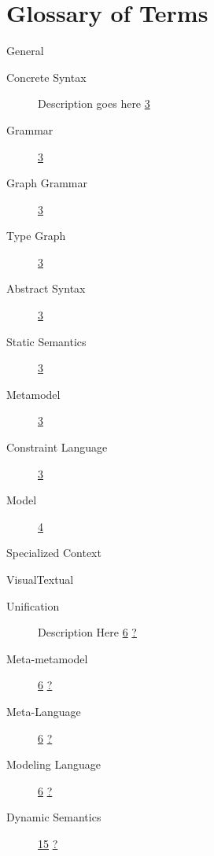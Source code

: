 \section{Glossary of Terms}

{\Large General}

\begin{description}

\item[Concrete Syntax] Description goes here \hfill \hyperlink{page.3}{3}

\item[Grammar] \hfill \hyperlink{page.3}{3} 

\item[Graph Grammar] \hfill \hyperlink{page.3}{3}

\item[Type Graph] \hfill \hyperlink{page.3}{3}

\item[Abstract Syntax] \hfill \hyperlink{page.3}{3}

\item[Static Semantics] \hfill \hyperlink{page.3}{3}

\item[Metamodel] \hfill \hyperlink{page.3}{3}

\item[Constraint Language] \hfill \hyperlink{page.3}{3}

\item[Model] \hfill \hyperlink{page.4}{4}

\end{description}

{\Large Specialized Context} %

\hspace{10cm}Visual\hspace{0.5cm}Textual

\begin{description}

\item[Unification] Description Here \hfill \hyperlink{page.6}{6} \hspace{1.5cm}\hyperlink{page.21}{?}

\item[Meta-metamodel] \hfill \hyperlink{page.6}{6} \hspace{1.5cm}\hyperlink{page.21}{?}

\item[Meta-Language] \hfill \hyperlink{page.6}{6} \hspace{1.5cm}\hyperlink{page.21}{?}

\item[Modeling Language] \hfill \hyperlink{page.6}{6} \hspace{1.5cm}\hyperlink{page.21}{?}

\item[Dynamic Semantics] \hfill \hyperlink{page.15}{15} \hspace{1.5cm}\hyperlink{page.21}{?}

\end{description}